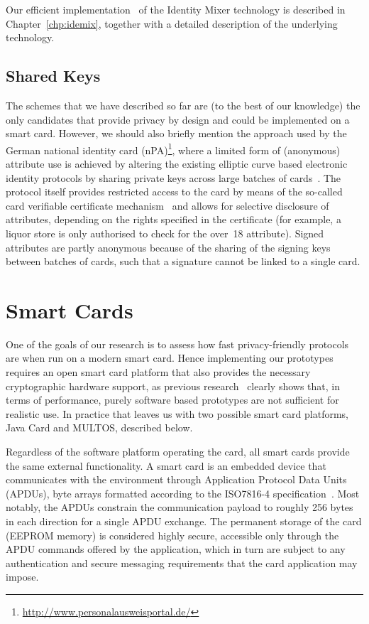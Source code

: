 Our efficient implementation~\cite{VullersAlpar2013} of the Identity Mixer
 technology is described in Chapter~\ref{chp:idemix},
together with a detailed description of the underlying technology.

\subsection{Shared Keys\label{sec:nPA}}

The schemes that we have described so far are (to the best of our knowledge) the
only candidates that provide privacy by design and could be implemented on a
smart card. However, we should also briefly mention the approach used by
the German national identity card (nPA)\footnote{%
\url{http://www.personalausweisportal.de/}}, where a limited form of (anonymous)
 attribute use is achieved by altering the existing
elliptic curve based electronic identity protocols by sharing private keys
 across large batches of cards~\cite{Kugler2010}. The
protocol itself provides restricted access to the card by means of the so-called
card verifiable certificate mechanism~\cite{EAC20} and allows for selective
disclosure of attributes, depending on the rights specified in the certificate
(for example, a liquor store is only authorised to check
for the \textsf{over~18} attribute). Signed attributes are partly anonymous
 because of the sharing of the signing keys between
batches of cards, such that a signature cannot be linked to a single card.

\section{Smart Cards\label{sec:smartcards}}

One of the goals of our research is to assess how fast privacy-friendly
protocols are when run on a modern smart card. Hence
implementing our prototypes requires an open smart card platform that also provides the necessary cryptographic hardware support,
as previous research~\cite{TewsJacobs09} clearly shows that, in terms of
performance, purely software based prototypes are not sufficient for realistic
use. In practice that leaves us with two possible smart card platforms, Java
Card and MULTOS, described below.

Regardless of the software platform operating the card, all smart cards provide
the same external functionality. A smart card is an embedded device that
communicates with the environment through Application Protocol Data Units
(APDUs), byte arrays formatted according to the ISO7816-4
specification~\cite{ISO7816_4}. Most notably, the APDUs constrain the
communication payload to roughly 256 bytes in each direction for a single APDU
exchange. The permanent storage of the card (EEPROM memory) is
considered highly secure, accessible only through the APDU commands offered by
the application, which in turn are subject to any authentication
 and secure messaging requirements that the card
application may impose.

